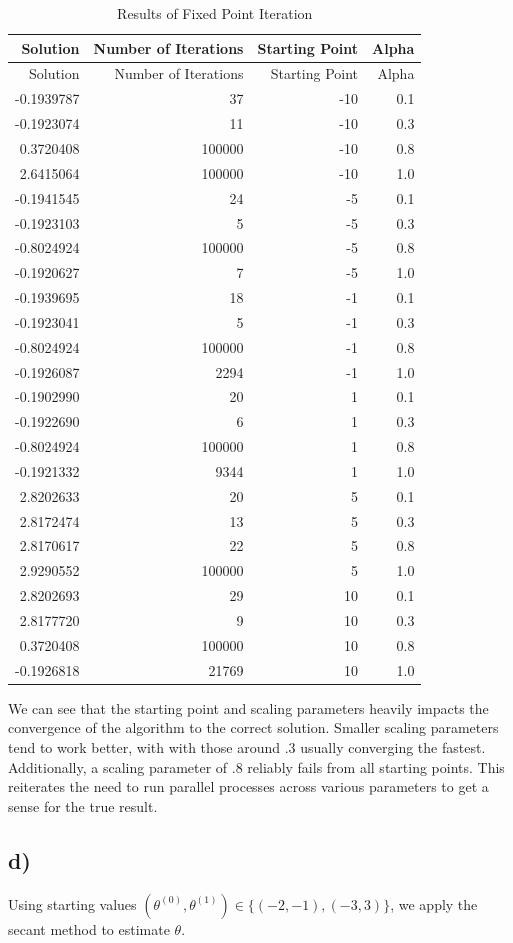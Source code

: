 \documentclass[]{article}
\begin{document}
\begin{longtable}[]{@{}rrrr@{}}
\caption{Results of Fixed Point Iteration}\tabularnewline
\toprule
Solution & Number of Iterations & Starting Point & Alpha\tabularnewline
\midrule
\endfirsthead
\toprule
Solution & Number of Iterations & Starting Point & Alpha\tabularnewline
\midrule
\endhead
-0.1939787 & 37 & -10 & 0.1\tabularnewline
-0.1923074 & 11 & -10 & 0.3\tabularnewline
0.3720408 & 100000 & -10 & 0.8\tabularnewline
2.6415064 & 100000 & -10 & 1.0\tabularnewline
-0.1941545 & 24 & -5 & 0.1\tabularnewline
-0.1923103 & 5 & -5 & 0.3\tabularnewline
-0.8024924 & 100000 & -5 & 0.8\tabularnewline
-0.1920627 & 7 & -5 & 1.0\tabularnewline
-0.1939695 & 18 & -1 & 0.1\tabularnewline
-0.1923041 & 5 & -1 & 0.3\tabularnewline
-0.8024924 & 100000 & -1 & 0.8\tabularnewline
-0.1926087 & 2294 & -1 & 1.0\tabularnewline
-0.1902990 & 20 & 1 & 0.1\tabularnewline
-0.1922690 & 6 & 1 & 0.3\tabularnewline
-0.8024924 & 100000 & 1 & 0.8\tabularnewline
-0.1921332 & 9344 & 1 & 1.0\tabularnewline
2.8202633 & 20 & 5 & 0.1\tabularnewline
2.8172474 & 13 & 5 & 0.3\tabularnewline
2.8170617 & 22 & 5 & 0.8\tabularnewline
2.9290552 & 100000 & 5 & 1.0\tabularnewline
2.8202693 & 29 & 10 & 0.1\tabularnewline
2.8177720 & 9 & 10 & 0.3\tabularnewline
0.3720408 & 100000 & 10 & 0.8\tabularnewline
-0.1926818 & 21769 & 10 & 1.0\tabularnewline
\bottomrule
\end{longtable}

We can see that the starting point and scaling parameters heavily
impacts the convergence of the algorithm to the correct solution.
Smaller scaling parameters tend to work better, with with those around
\(.3\) usually converging the fastest. Additionally, a scaling parameter
of \(.8\) reliably fails from all starting points. This reiterates the
need to run parallel processes across various parameters to get a sense
for the true result.

\subsection{d)}\label{d-1}

Using starting values
\((\theta^{(0)}, \theta^{(1)}) \in \{(-2, -1), (-3, 3)\}\), we apply the
secant method to estimate \(\theta\).
\end{document}
